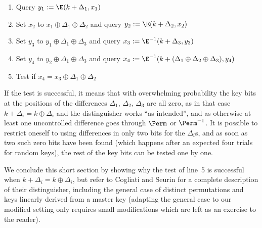 \begin{enumerate}[leftmargin=4em]
	\item Query $y_1 := \E(k + \Delta_1, x_1)$
	\item Set $x_2$ to $x_1 \oplus \Delta_1 \oplus \Delta_2$ and query $y_2 := \E(k + \Delta_2, x_2)$
	\item Set $y_3$ to $y_1 \oplus \Delta_1 \oplus \Delta_3$ and query $x_3 := \E^{-1}(k + \Delta_3, y_3)$
	\item Set $y_4$  to $y_2 \oplus \Delta_1 \oplus \Delta_3$ and query $x_4 := \E^{-1}(k + (\Delta_1 \oplus \Delta_2 \oplus \Delta_3), y_4)$
	\item Test if $x_4 = x_3 \oplus \Delta_1 \oplus \Delta_2$
\end{enumerate}

If the test is successful, it means that with overwhelming probability
the key bits at the positions of the differences $\Delta_1$, $\Delta_2$,
$\Delta_3$ are all zero, as in that case  $k + \Delta_i = k \oplus \Delta_i$ and
the distinguisher works ``as intended'', and as otherwise at least one uncontrolled difference goes through $\Perm$ or $\Perm^{-1}$.
It is possible to restrict oneself to using differences in only two bits for the $\Delta_i$s, and as soon as two such zero bits
have been found (which happens after an expected four trials for
random keys), the rest of the key bits can be tested one by one.

We conclude this short section by showing why the test of line~5 is successful when $k + \Delta_i = k \oplus \Delta_i$,
but refer to Cogliati and Seurin for a complete description of their distinguisher, including the general case of distinct
permutations and keys linearly derived from a master key (adapting the general case to our modified setting only requires small modifications which are left as an exercise to the reader).

